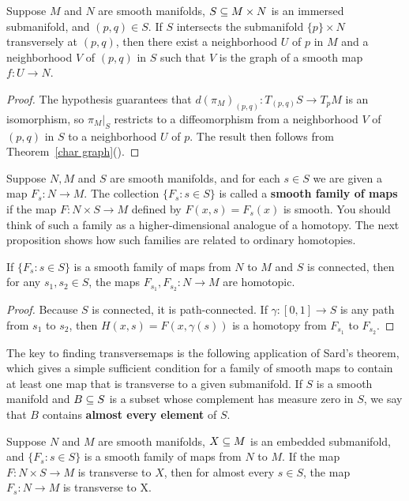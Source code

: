 \begin{corollary}\label{char graph local}
Suppose $M$ and $N$ are smooth manifolds, $S\subseteq M\times N$ is an immersed submanifold, and $(p,q)\in S$. If $S$ intersects the submanifold $\{p\}\times N$ transversely at $(p,q)$, then there exist a neighborhood $U$ of $p$ in $M$ and a neighborhood $V$ of $(p,q)$ in $S$ such that $V$ is the graph of a smooth map $f:U\to N$.
\end{corollary}
\begin{proof}
The hypothesis guarantees that $d(\pi_M)_{(p,q)}:T_{(p,q)}S\to T_pM$ is an isomorphism, so $\pi_M|_S$ restricts to a diffeomorphism from a neighborhood $V$ of $(p,q)$ in $S$ to a neighborhood $U$ of $p$. The result then follows from Theorem~\ref{char graph}().
\end{proof}
Suppose $N,M$ and $S$ are smooth manifolds, and for each $s\in S$ we are given a map $F_s:N\to M$. The collection $\{F_s:s\in S\}$ is called a \textbf{smooth family of maps} if the map $F:N\times S\to M$ defined by $F(x,s)=F_s(x)$ is smooth. You should think of such a family as a higher-dimensional analogue of a homotopy. The next proposition shows how such families are related to ordinary homotopies.
\begin{proposition}\label{smooth family map homotopy}
If $\{F_s:s\in S\}$ is a smooth family of maps from $N$ to $M$ and $S$ is connected, then for any $s_1,s_2\in S$, the maps $F_{s_1},F_{s_2}:N\to M$ are homotopic.
\end{proposition}
\begin{proof}
Because $S$ is connected, it is path-connected. If $\gamma:[0,1]\to S$ is any path from $s_1$ to $s_2$, then $H(x,s)=F(x,\gamma(s))$ is a homotopy from $F_{s_1}$ to $F_{s_2}$.
\end{proof}
The key to finding transversemaps is the following application of Sard's theorem, which gives a simple sufficient condition for a family of smooth maps to contain at least one map that is transverse to a given submanifold. If $S$ is a smooth manifold and $B\subseteq S$ is a subset whose complement has measure zero in $S$, we say that $B$ contains \textbf{almost every element} of $S$.
\begin{theorem}\label{parametric transversality}
Suppose $N$ and $M$ are smooth manifolds, $X\subseteq M$ is an embedded submanifold, and $\{F_s:s\in S\}$ is a smooth family of maps from $N$ to $M$. If the map $F:N\times S\to M$ is transverse to $X$, then for almost every $s\in S$, the map $F_s:N\to M$ is transverse to X.
\end{theorem}
